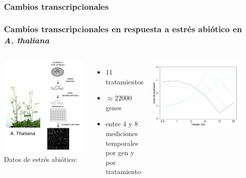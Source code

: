 \documentclass[serif,9pt, t]{beamer}
\begin{document}
\subsubsection*{Cambios transcripcionales}
\begin{frame}\frametitle{Cambios transcripcionales en respuesta a estrés abiótico en \textit{A. thaliana}} 
	\begin{columns}[T]
			\includegraphics[width=1\textwidth]{micromatriz_y_arabidopsis}
			\bigskip
			\Large 
			Datos de estrés abiótico:
			\medskip
			\begin{itemize}
				\item 11 tratamientos
				\item $\approx 22000$ genes
				\item entre 4 y 8 mediciones temporales por gen y por tratamiento 
			\end{itemize}			
			\centering	
			\includegraphics[width=0.9\textwidth]{perfiles_sin_agrupar.pdf}			

\end{columns}
\end{frame}
\end{document}
